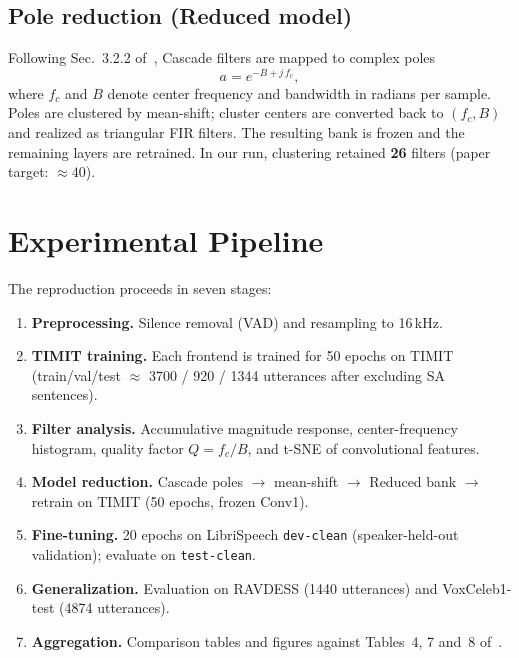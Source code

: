\documentclass[11pt,a4paper]{article}
\begin{document}
\subsection{Pole reduction (Reduced model)}

Following Sec.~3.2.2 of~\cite{fayyazi2023}, Cascade filters are mapped to complex poles
\begin{equation}
  a = e^{-B+j\,f_c},
\end{equation}
where $f_c$ and $B$ denote center frequency and bandwidth in radians per sample. Poles are clustered by mean-shift; cluster centers are converted back to $(f_c,B)$ and realized as triangular FIR filters. The resulting bank is frozen and the remaining layers are retrained. In our run, clustering retained \textbf{26} filters (paper target: $\approx 40$).

\section{Experimental Pipeline}

The reproduction proceeds in seven stages:

\begin{enumerate}[leftmargin=1.6em,itemsep=0.35em]
  \item \textbf{Preprocessing.} Silence removal (VAD) and resampling to 16\,kHz.
  \item \textbf{TIMIT training.} Each frontend is trained for 50 epochs on TIMIT (train/val/test $\approx$ 3700 / 920 / 1344 utterances after excluding SA sentences).
  \item \textbf{Filter analysis.} Accumulative magnitude response, center-frequency histogram, quality factor $Q=f_c/B$, and t-SNE of convolutional features.
  \item \textbf{Model reduction.} Cascade poles $\to$ mean-shift $\to$ Reduced bank $\to$ retrain on TIMIT (50 epochs, frozen Conv1).
  \item \textbf{Fine-tuning.} 20 epochs on LibriSpeech \texttt{dev-clean} (speaker-held-out validation); evaluate on \texttt{test-clean}.
  \item \textbf{Generalization.} Evaluation on RAVDESS (1440 utterances) and VoxCeleb1-test (4874 utterances).
  \item \textbf{Aggregation.} Comparison tables and figures against Tables~4, 7 and~8 of~\cite{fayyazi2023}.
\end{enumerate}
\end{document}
